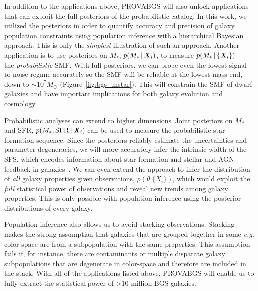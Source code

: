 In addition to the applications above, {\sc PROVABGS} will also unlock
applications that can exploit the full posteriors of the probabilistic catalog.
In this work, we utilized the posteriors in order to quantify accuracy and
precision of galaxy population constraints using population inference with a
hierarchical Bayesian approach. 
This is only the \emph{simplest} illustration of such an approach. 
Another application is to use posteriors on $M_*$, $p(M_* \,|\, {\textbf{\textit{X}}}_i)$,
to measure $p(M_* \,|\, \{ {\textbf{\textit{X}}_i} \})$ --- the \emph{probabilistic} SMF.
With full posteriors, we can probe even the lowest signal-to-noise regime
accurately so the SMF will be reliable at the lowest mass end, down to
${\sim}10^{7} M_\odot$ (Figure~\ref{fig:bgs_mstar}). 
This will constrain the SMF of dwarf galaxies and have important
implications for both galaxy evolution and cosmology. 

Probabilistic analyses can extend to higher dimensions. 
Joint posteriors on $M_*$ and SFR, $p(M_*, {\rm SFR} \,|\, {\textbf{\textit{X}}}_i)$
can be used to measure the probabilistic star formation sequence. 
Since the posteriors reliably estimate the uncertainties and parameter
degeneracies, we will more accurately infer the intrinsic width of the
SFS, which encodes information about star formation and stellar and AGN
feedback in galaxies~\citep{davies2021}. 
We can even extend the approach to infer the distribution of \emph{all}
galaxy properties given observations, $p(\theta | \{X_i\})$, which would
exploit the \emph{full} statistical power of observations and reveal new
trends among galaxy properties. 
This is only possible with population inference using the posterior
distributions of every galaxy.

Population inference also allows us to avoid stacking observations. 
Stacking makes the strong assumption that galaxies that are grouped together in
some \emph{e.g.} color-space are from a subpopulation with the same properties. 
This assumption fails if, for instance, there are contaminants or multiple
disparate galaxy subpopulations that are degenerate in color-space and
therefore are included in the stack. 
With all of the applications listed above, {\sc PROVABGS} will enable us to
fully extract the statistical power of >10 million BGS galaxies.
